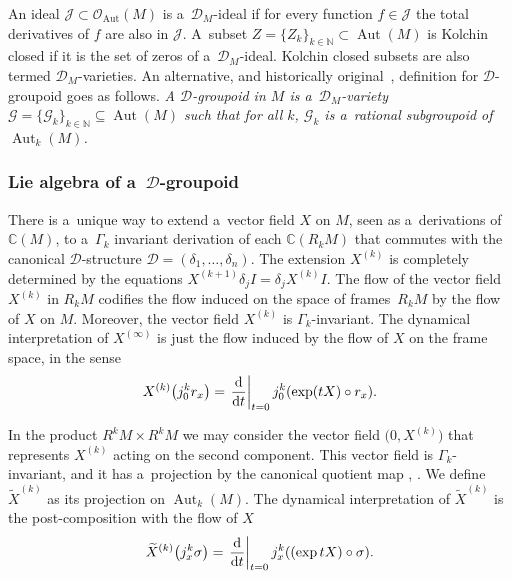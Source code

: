 \documentclass[10pt,a4paper]{amsart}
\numberwithin{equation}{section}
\theoremstyle{definition}
\begin{document}
An ideal $\mathcal J \subset \mathcal O_{\operatorname{Aut}}(M)$ is a~$\mathcal D_M$-ideal if for every function $f\in \mathcal J$ the total derivatives of $f$ are also in $\mathcal J$. A~subset $Z = \{Z_k\}_{k\in\mathbb N} \subset \operatorname{Aut}(M)$ is Kolchin closed if it is the set of zeros of a~$\mathcal D_M$-ideal. Kolchin closed subsets are also termed $\mathcal D_M$-varieties. An alternative, and historically original~\cite{malgrange2001groupoide}, definition for $\mathcal D$-groupoid goes as follows. \emph{A $\mathcal D$-groupoid in $M$ is a~$\mathcal D_M$-variety~${\mathcal G = \{\mathcal G_k\}_{k\in \mathbb N} \subseteq \operatorname{Aut}(M)}$ such that for all $k$, $\mathcal G_k$ is a~rational subgroupoid of $\operatorname{Aut}_k(M)$. }

\subsubsection[Lie algebra of a~D-groupoid]{Lie algebra of a~$\boldsymbol{\mathcal D}$-groupoid}

There is a~unique way to extend a~vector field $X$ on $M$, seen as a~derivations of $\mathbb C(M)$, to a~$\Gamma_k$ invariant derivation of each $\mathbb C(R_kM)$ that commutes with the canonical $\mathcal D$-structure $\mathcal D = (\delta_1,\dots,\delta_n)$. The extension $X^{(k)}$ is completely determined by the equations
$X^{(k+1)} \delta_j I = \delta_j X^{(k)}I$.
The flow of the vector field $X^{(k)}$ in $R_kM$ codifies the flow induced on the space of frames~$R_kM$ by the flow of $X$ on $M$. Moreover, the vector field $X^{(k)}$ is $\Gamma_k$-invariant. The dynamical interpretation of $X^{(\infty)}$ is just the flow induced by the flow of $X$ on the frame space, in the sense
\[X^{(k)}\bigl(j^k_0r_x\bigr) = \left.\frac{{\rm d}}{{\rm d} t}\right\vert_{t=0} j^k_0(\exp(tX)\circ r_x).\]

In the product $R^kM\times R^kM$ we may consider the vector field $\bigl(0,X^{(k)}\bigr)$ that represents $X^{(k)}$ acting on the second component. This vector field is $\Gamma_k$-invariant, and it has a~projection by the canonical quotient map , . We define $\widetilde X^{(k)}$ as its projection on $\operatorname{Aut}_k(M)$. The dynamical interpretation of $\widetilde X^{(k)}$ is the post-composition with the flow of $X$
\[\widetilde X^{(k)}\bigl(j_x^k \sigma\bigr) = \left.\frac{{\rm d}}{{\rm d} t}\right\vert_{t=0} j_x^k((\exp tX)\circ \sigma).\]
\end{document}

